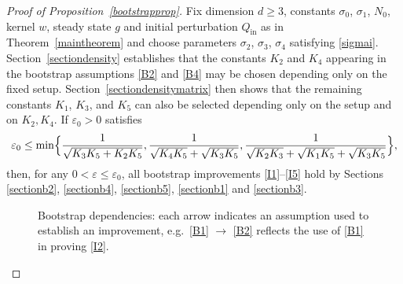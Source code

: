 \documentclass[10pt,a4paper]{amsart}
\providecommand{\eg}{e.g.\ }
\theoremstyle{plain}
\theoremstyle{remark}
\newcommand{\Bset}[1]{\Bigl\{#1\Bigr\}}
\newcommand{\ep}{\varepsilon}
\newcommand{\Qin}{Q_{\mathrm{in}}}
\begin{document}
\begin{proof}[Proof of Proposition~\ref{bootstrapprop}]
Fix dimension $d\geq 3$, constants $\sigma_0$, $\sigma_1$, $N_0$, kernel $w$, steady state $g$ and initial perturbation $\Qin$ as in Theorem~\ref{maintheorem} and choose parameters $\sigma_2$, $\sigma_3$, $\sigma_4$ satisfying \eqref{sigmai}. Section~\ref{sectiondensity} establishes that the constants $K_2$ and $K_4$ appearing in the bootstrap assumptions \eqref{B2} and \eqref{B4} may be chosen depending only on the fixed setup. Section~\ref{sectiondensitymatrix} then shows that the remaining constants $K_1$, $K_3$, and $K_5$ can also be selected depending only on the setup and on $K_2, K_4$. If $\ep_0>0$ satisfies
\begin{align*}
\ep_0\leq\min\Bset{\frac{1}{\sqrt{K_3K_5+K_2K_5}},\frac{1}{\sqrt{K_4K_5}+\sqrt{K_3K_5}},\frac{1}{\sqrt{K_2K_3}+\sqrt{K_1K_5}+\sqrt{K_3K_5}}},
\end{align*}
then, for any $0<\ep\leq \ep_0$, all bootstrap improvements \eqref{I1}--\eqref{I5} hold by Sections \ref{sectionb2}, \ref{sectionb4}, \ref{sectionb5}, \ref{sectionb1} and \ref{sectionb3}.

\begin{figure}[ht]
\centering
{}
\captionsetup{width=.7\linewidth}
\caption{Bootstrap dependencies: each arrow indicates an assumption used to establish an improvement, \eg \eqref{B1} $\rightarrow$ \eqref{B2} reflects the use of \eqref{B1} in proving \eqref{I2}.}


\end{figure}
\end{proof}
\end{document}
